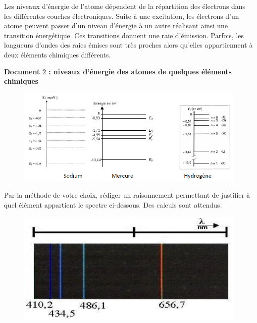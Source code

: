 \vspace{0.3cm}

Les niveaux d'énergie de l'atome dépendent de la répartition des électrons dans les différentes couches électroniques. Suite à une excitation, les électrons d'un atome peuvent passer d'un niveau d'énergie à un autre
réalisant ainsi une transition énergétique. Ces transitions donnent une raie d'émission. Parfois, les longueurs d'ondes des raies émises sont très proches alors qu'elles appartiennent à deux éléments chimiques différents.

\vspace{0.3cm}

\textbf{Document $2$ : niveaux d'énergie des atomes de quelques éléments chimiques}


\begin{figure}[h]
\begin{center}
\includegraphics[width=0.75\columnwidth]{images/Exo7_Niveaux_Energie_Atomes}
\end{center}
\end{figure}

\vspace{0.3cm}

Par la méthode de votre choix, rédiger un raisonnement permettant de justifier à quel élément appartient le spectre
ci-dessous. Des calculs sont attendus.

\begin{figure}[h]
\begin{center}
\includegraphics[width=0.5\columnwidth]{images/Exo7_Spectre_Raies_Emission}
\end{center}
\end{figure}

